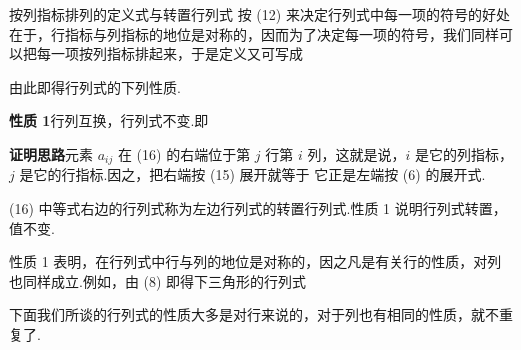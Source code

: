 \begin{fdeep}{按列指标排列的定义式与转置行列式}
按 (12) 来决定行列式中每一项的符号的好处在于，行指标与列指标的地位是对称的，因而为了决定每一项的符号，我们同样可以把每一项按列指标排起来，于是定义又可写成

由此即得行列式的下列性质.

\textbf{性质 1}\quad 行列互换，行列式不变.即

\textbf{证明思路}\quad 元素 $a_{ij}$ 在 (16) 的右端位于第 $j$ 行第 $i$ 列，这就是说，$i$ 是它的列指标，$j$ 是它的行指标.因之，把右端按 (15) 展开就等于
它正是左端按 (6) 的展开式.

(16) 中等式右边的行列式称为左边行列式的转置行列式.性质 1 说明行列式转置，值不变.

性质 1 表明，在行列式中行与列的地位是对称的，因之凡是有关行的性质，对列也同样成立.例如，由 (8) 即得下三角形的行列式

下面我们所谈的行列式的性质大多是对行来说的，对于列也有相同的性质，就不重复了.
\end{fdeep}


